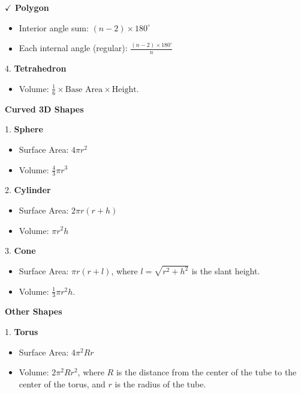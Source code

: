 \textbf{$\checkmark$ Polygon}

\begin{itemize}
  \item Interior angle sum:
  $(n-2) \times 180^{\circ}$

  \item Each internal angle (regular):
  $\frac{(n-2)\times180^{\circ}}{n}$
\end{itemize}

4. \textbf{Tetrahedron}
\begin{itemize}
  \item Volume: $\frac{1}{6} \times \text{Base Area} \times \text{Height}$.
\end{itemize}

\textbf{Curved 3D Shapes}

1. \textbf{Sphere}
\begin{itemize}
  \item Surface Area: $4\pi r^2$
  \item Volume: $\frac{4}{3}\pi r^3$
\end{itemize}
2. \textbf{Cylinder}
\begin{itemize}
  \item Surface Area: $2\pi r(r+h)$
  \item Volume: $\pi r^2 h$
\end{itemize}
3. \textbf{Cone}
\begin{itemize}
  \item Surface Area: $\pi r(r+l)$, where $l=\sqrt{r^2+h^2}$ is the slant height.
  \item Volume: $\frac{1}{3}\pi r^2 h$.
\end{itemize}

\textbf{Other Shapes}

1. \textbf{Torus}
\begin{itemize}
  \item Surface Area: $4\pi^2 Rr$
  \item Volume: $2\pi^2 Rr^2$, where $R$ is the distance from the center of the tube to the center of the torus, and $r$ is the radius of the tube.
\end{itemize}

\vspace{2em}
\begin{center}
\end{center}
\vspace{1em}

